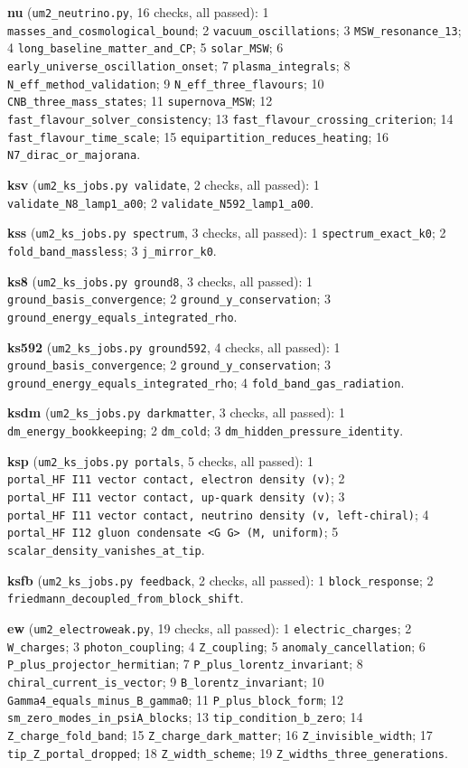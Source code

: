 \documentclass[
  10pt,
]{article}
\begin{document}
\textbf{nu} (\texttt{um2\_neutrino.py}, 16 checks, all passed): 1
\texttt{masses\_and\_cosmological\_bound}; 2
\texttt{vacuum\_oscillations}; 3 \texttt{MSW\_resonance\_13}; 4
\texttt{long\_baseline\_matter\_and\_CP}; 5 \texttt{solar\_MSW}; 6
\texttt{early\_universe\_oscillation\_onset}; 7
\texttt{plasma\_integrals}; 8 \texttt{N\_eff\_method\_validation}; 9
\texttt{N\_eff\_three\_flavours}; 10 \texttt{CNB\_three\_mass\_states};
11 \texttt{supernova\_MSW}; 12
\texttt{fast\_flavour\_solver\_consistency}; 13
\texttt{fast\_flavour\_crossing\_criterion}; 14
\texttt{fast\_flavour\_time\_scale}; 15
\texttt{equipartition\_reduces\_heating}; 16
\texttt{N7\_dirac\_or\_majorana}.

\textbf{ksv} (\texttt{um2\_ks\_jobs.py\ validate}, 2 checks, all
passed): 1 \texttt{validate\_N8\_lamp1\_a00}; 2
\texttt{validate\_N592\_lamp1\_a00}.

\textbf{kss} (\texttt{um2\_ks\_jobs.py\ spectrum}, 3 checks, all
passed): 1 \texttt{spectrum\_exact\_k0}; 2
\texttt{fold\_band\_massless}; 3 \texttt{j\_mirror\_k0}.

\textbf{ks8} (\texttt{um2\_ks\_jobs.py\ ground8}, 3 checks, all passed):
1 \texttt{ground\_basis\_convergence}; 2
\texttt{ground\_y\_conservation}; 3
\texttt{ground\_energy\_equals\_integrated\_rho}.

\textbf{ks592} (\texttt{um2\_ks\_jobs.py\ ground592}, 4 checks, all
passed): 1 \texttt{ground\_basis\_convergence}; 2
\texttt{ground\_y\_conservation}; 3
\texttt{ground\_energy\_equals\_integrated\_rho}; 4
\texttt{fold\_band\_gas\_radiation}.

\textbf{ksdm} (\texttt{um2\_ks\_jobs.py\ darkmatter}, 3 checks, all
passed): 1 \texttt{dm\_energy\_bookkeeping}; 2 \texttt{dm\_cold}; 3
\texttt{dm\_hidden\_pressure\_identity}.

\textbf{ksp} (\texttt{um2\_ks\_jobs.py\ portals}, 5 checks, all passed):
1 \texttt{portal\_HF\ I11\ vector\ contact,\ electron\ density\ (v)}; 2
\texttt{portal\_HF\ I11\ vector\ contact,\ up-quark\ density\ (v)}; 3
\texttt{portal\_HF\ I11\ vector\ contact,\ neutrino\ density\ (v,\ left-chiral)};
4
\texttt{portal\_HF\ I12\ gluon\ condensate\ \textless{}G\ G\textgreater{}\ (M,\ uniform)};
5 \texttt{scalar\_density\_vanishes\_at\_tip}.

\textbf{ksfb} (\texttt{um2\_ks\_jobs.py\ feedback}, 2 checks, all
passed): 1 \texttt{block\_response}; 2
\texttt{friedmann\_decoupled\_from\_block\_shift}.

\textbf{ew} (\texttt{um2\_electroweak.py}, 19 checks, all passed): 1
\texttt{electric\_charges}; 2 \texttt{W\_charges}; 3
\texttt{photon\_coupling}; 4 \texttt{Z\_coupling}; 5
\texttt{anomaly\_cancellation}; 6
\texttt{P\_plus\_projector\_hermitian}; 7
\texttt{P\_plus\_lorentz\_invariant}; 8
\texttt{chiral\_current\_is\_vector}; 9 \texttt{B\_lorentz\_invariant};
10 \texttt{Gamma4\_equals\_minus\_B\_gamma0}; 11
\texttt{P\_plus\_block\_form}; 12
\texttt{sm\_zero\_modes\_in\_psiA\_blocks}; 13
\texttt{tip\_condition\_b\_zero}; 14 \texttt{Z\_charge\_fold\_band}; 15
\texttt{Z\_charge\_dark\_matter}; 16 \texttt{Z\_invisible\_width}; 17
\texttt{tip\_Z\_portal\_dropped}; 18 \texttt{Z\_width\_scheme}; 19
\texttt{Z\_widths\_three\_generations}.
\end{document}
